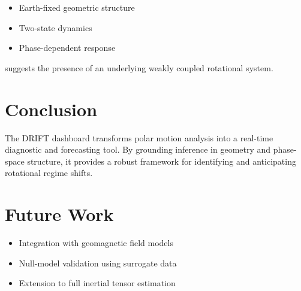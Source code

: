 \documentclass[11pt]{article}
\begin{document}
\begin{itemize}
\item Earth-fixed geometric structure
\item Two-state dynamics
\item Phase-dependent response
\end{itemize}

suggests the presence of an underlying weakly coupled rotational system.

\section{Conclusion}

The DRIFT dashboard transforms polar motion analysis into a real-time diagnostic and forecasting tool. By grounding inference in geometry and phase-space structure, it provides a robust framework for identifying and anticipating rotational regime shifts.

\section*{Future Work}

\begin{itemize}
\item Integration with geomagnetic field models
\item Null-model validation using surrogate data
\item Extension to full inertial tensor estimation
\end{itemize}
\end{document}
